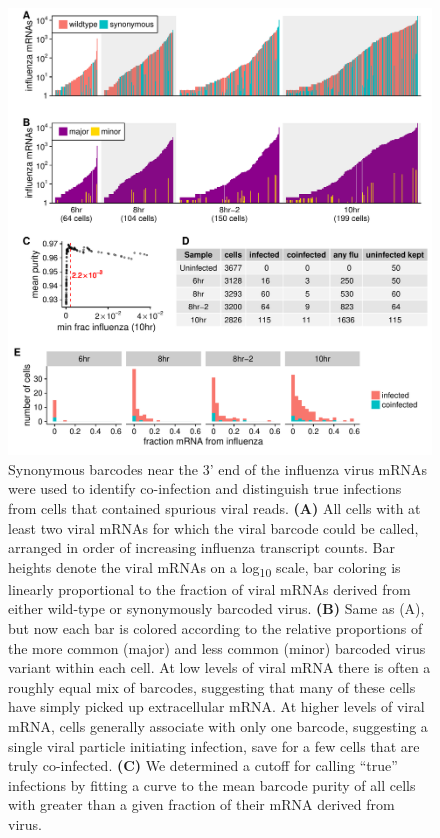 \documentclass[9pt,lineno]{elife}
\begin{document}
\begin{figure}
\includegraphics[width=\linewidth]{figures/p_frac_flu_summary.pdf}
\caption{\label{fig:viralbarcodes}
Synonymous barcodes near the 3' end of the influenza virus mRNAs were used to identify co-infection and distinguish true infections from cells that contained spurious viral reads.
{\bf (A)}
All cells with at least two viral mRNAs for which the viral barcode could be called, arranged in order of increasing influenza transcript counts.
Bar heights denote the viral mRNAs on a log\textsubscript{10} scale, bar coloring is linearly proportional to the fraction of viral mRNAs derived from either wild-type or synonymously barcoded virus.
{\bf (B)}
Same as (A), but now each bar is colored according to the relative proportions of the more common (major) and less common (minor) barcoded virus variant within each cell.
At low levels of viral mRNA there is often a roughly equal mix of barcodes, suggesting that many of these cells have simply picked up extracellular mRNA.
At higher levels of viral mRNA, cells generally associate with only one barcode, suggesting a single viral particle initiating infection, save for a few cells that are truly co-infected.
{\bf (C)}
We determined a cutoff for calling ``true'' infections by fitting a curve to the mean barcode purity of all cells with greater than a given fraction of their mRNA derived from virus.
}
\end{figure}
\end{document}
